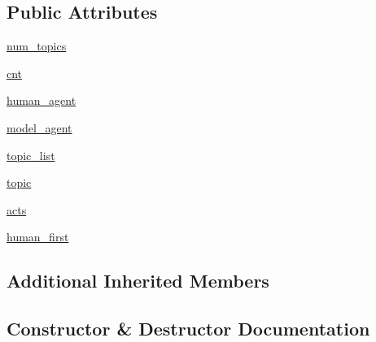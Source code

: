 \subsection*{Public Attributes}
\begin{DoxyCompactItemize}
\item 
\hyperlink{classparlai_1_1tasks_1_1wizard__of__wikipedia_1_1worlds_1_1InteractiveWorld_a32f2d277a7892c9e8c7c64c12a8f4ba7}{num\+\_\+topics}
\item 
\hyperlink{classparlai_1_1tasks_1_1wizard__of__wikipedia_1_1worlds_1_1InteractiveWorld_ac89fdf4af0e037452e4e965560b68eea}{cnt}
\item 
\hyperlink{classparlai_1_1tasks_1_1wizard__of__wikipedia_1_1worlds_1_1InteractiveWorld_a54ecd8d0f7c5dd064d0c2b511f9ac03b}{human\+\_\+agent}
\item 
\hyperlink{classparlai_1_1tasks_1_1wizard__of__wikipedia_1_1worlds_1_1InteractiveWorld_abc5413fa516f7fb0cc4e0c52d918d572}{model\+\_\+agent}
\item 
\hyperlink{classparlai_1_1tasks_1_1wizard__of__wikipedia_1_1worlds_1_1InteractiveWorld_ad323b2b928a31a0b048059a1569ae8f2}{topic\+\_\+list}
\item 
\hyperlink{classparlai_1_1tasks_1_1wizard__of__wikipedia_1_1worlds_1_1InteractiveWorld_ad248b70f56a67f58e7799eb126315169}{topic}
\item 
\hyperlink{classparlai_1_1tasks_1_1wizard__of__wikipedia_1_1worlds_1_1InteractiveWorld_af926c611144cdc54b7f1c631286b388b}{acts}
\item 
\hyperlink{classparlai_1_1tasks_1_1wizard__of__wikipedia_1_1worlds_1_1InteractiveWorld_a8a0ba61c930502f811dd033a6e52c327}{human\+\_\+first}
\end{DoxyCompactItemize}
\subsection*{Additional Inherited Members}


\subsection{Constructor \& Destructor Documentation}
\mbox{\label{classparlai_1_1tasks_1_1wizard__of__wikipedia_1_1worlds_1_1InteractiveWorld_a17330f1fd256bd53eafea1c7e119d77d}} 
